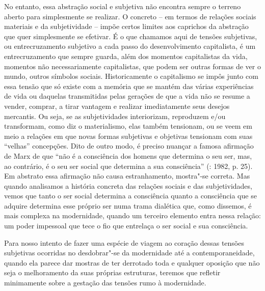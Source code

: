 No entanto, essa abstração social e subjetiva não encontra sempre o
terreno aberto para simplesmente se realizar. O concreto -- em termos de
relações sociais materiais e da subjetividade -- impõe certos limites
aos caprichos da abstração que quer simplesmente se efetivar. É o que
chamamos aqui de tensões subjetivas, ou entrecruzamento subjetivo a cada
passo do desenvolvimento capitalista, é um entrecruzamento que sempre
guarda, além dos momentos capitalistas da vida, momentos não
necessariamente capitalistas, que podem ser outras formas de ver o
mundo, outros símbolos sociais. Historicamente o capitalismo se impôs
junto com essa tensão que só existe com a memória que se mantém das
várias experiências de vida ou daquelas transmitidas pelas gerações de
que a vida não se resume a vender, comprar, a tirar vantagem e realizar
imediatamente seus desejos mercantis. Ou seja, se as subjetividades
interiorizam, reproduzem e/ou transformam, como diz o materialismo, elas
também tensionam, ou se veem em meio a relações em que novas formas
subjetivas e objetivas tensionam com suas ``velhas'' concepções. Dito de
outro modo, é preciso nuançar a famosa afirmação de Marx de que ``não é
a consciência dos homens que determina o seu ser, mas, ao contrário, é o
seu ser social que determina a sua consciência'' (: 1982, p. 25). Em
abstrato essa afirmação não causa estranhamento, mostra"-se correta. Mas
quando analisamos a história concreta das relações sociais e das
subjetividades, vemos que tanto o ser social determina a consciência
quanto a consciência que se adquire determina esse próprio ser numa
trama dialética que, como dissemos, é mais complexa na modernidade,
quando um terceiro elemento entra nessa relação: um poder impessoal que
tece o fio que entrelaça o ser social e sua consciência.

Para nosso intento de fazer uma espécie de viagem ao coração dessas
tensões subjetivas ocorridas no desdobrar"-se da modernidade até a
contemporaneidade, quando ela parece dar mostras de ter derrotado toda e
qualquer oposição que não seja o melhoramento da suas próprias
estruturas, teremos que refletir minimamente sobre a gestação das
tensões rumo à modernidade.

